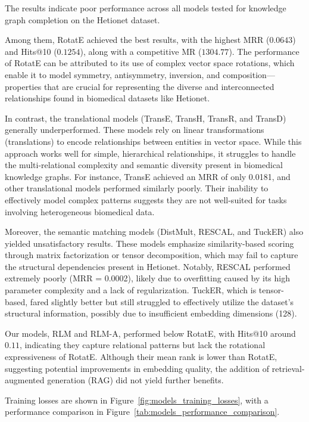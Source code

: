 The results indicate poor performance across all models tested for knowledge graph completion on the Hetionet dataset.

Among them, RotatE achieved the best results, with the highest MRR ($0.0643$) and Hits@10 ($0.1254$), along with a competitive MR ($1304.77$). The performance of RotatE can be attributed to its use of complex vector space rotations, which enable it to model symmetry, antisymmetry, inversion, and composition—properties that are crucial for representing the diverse and interconnected relationships found in biomedical datasets like Hetionet.

In contrast, the translational models (TransE, TransH, TransR, and TransD) generally underperformed. These models rely on linear transformations (translations) to encode relationships between entities in vector space. While this approach works well for simple, hierarchical relationships, it struggles to handle the multi-relational complexity and semantic diversity present in biomedical knowledge graphs. For instance, TransE achieved an MRR of only 0.0181, and other translational models performed similarly poorly. Their inability to effectively model complex patterns suggests they are not well-suited for tasks involving heterogeneous biomedical data.

Moreover, the semantic matching models (DistMult, RESCAL, and TuckER) also yielded unsatisfactory results. These models emphasize similarity-based scoring through matrix factorization or tensor decomposition, which may fail to capture the structural dependencies present in Hetionet. Notably, RESCAL performed extremely poorly (MRR = 0.0002), likely due to overfitting caused by its high parameter complexity and a lack of regularization. TuckER, which is tensor-based, fared slightly better but still struggled to effectively utilize the dataset’s structural information, possibly due to insufficient embedding dimensions (128).

Our models, RLM and RLM-A, performed below RotatE, with Hits@10 around $0.11$, indicating they capture relational patterns but lack the rotational expressiveness of RotatE.
Although their mean rank is lower than RotatE, suggesting potential improvements in embedding quality, the addition of retrieval-augmented generation (RAG) did not yield further benefits.

Training losses are shown in Figure~\ref{fig:models_training_losses}, with a performance comparison in Figure~\ref{tab:models_performance_comparison}.

